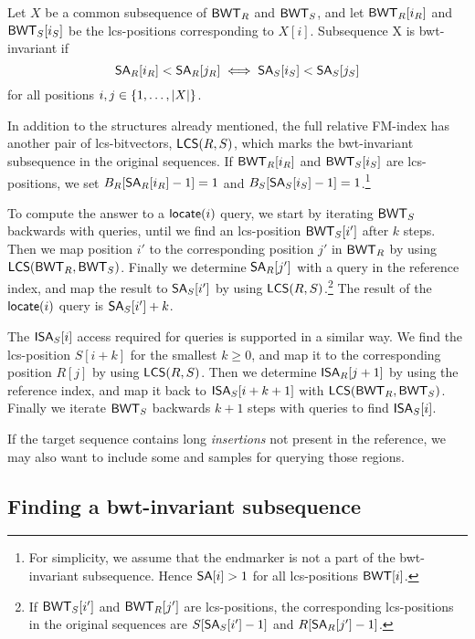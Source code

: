 \begin{definition}\label{def:bwt-invariant}
Let $X$ be a common subsequence of $\mathsf{BWT}_{R}$ and $\mathsf{BWT}_{S}$, and let
$\mathsf{BWT}_{R}[i_{R}]$ and $\mathsf{BWT}_{S}[i_{S}]$ be the lcs-positions corresponding to
$X[i]$. Subsequence X is bwt-invariant if
$$
\mathsf{SA}_{R}[i_{R}] < \mathsf{SA}_{R}[j_{R}] \iff \mathsf{SA}_{S}[i_{S}] < \mathsf{SA}_{S}[j_{S}]
$$
for all positions $i, j \in \{ 1, \dotsc, \lvert X \rvert \}$.
\end{definition}

In addition to the structures already mentioned, the full relative FM-index
has another pair of lcs-bitvectors, $\mathsf{LCS}(R,S)$, which marks the
bwt-invariant subsequence in the original sequences. If $\mathsf{BWT}_{R}[i_{R}]$ and
$\mathsf{BWT}_{S}[i_{S}]$ are lcs-positions, we set $B_{R}[\mathsf{SA}_{R}[i_{R}]-1] = 1$ and
$B_{S}[\mathsf{SA}_{S}[i_{S}]-1] = 1$.\footnote{For simplicity, we assume that the
endmarker is not a part of the bwt-invariant subsequence. Hence $\mathsf{SA}[i] > 1$
for all lcs-positions $\mathsf{BWT}[i]$.}

To compute the answer to a $\mathsf{locate}(i)$ query, we start by iterating
$\mathsf{BWT}_{S}$ backwards with \LF{} queries, until we find an lcs-position
$\mathsf{BWT}_{S}[i']$ after $k$ steps. Then we map position $i'$ to the corresponding
position $j'$ in $\mathsf{BWT}_{R}$ by using $\mathsf{LCS}(\mathsf{BWT}_{R},\mathsf{BWT}_{S})$. Finally we
determine $\mathsf{SA}_{R}[j']$ with a \locate{} query in the reference index, and map
the result to $\mathsf{SA}_{S}[i']$ by using $\mathsf{LCS}(R,S)$.\footnote{If $\mathsf{BWT}_{S}[i']$
and $\mathsf{BWT}_{R}[j']$ are lcs-positions, the corresponding lcs-positions in the
original sequences are $S[\mathsf{SA}_{S}[i']-1]$ and $R[\mathsf{SA}_{R}[j']-1]$.} The result
of the $\mathsf{locate}(i)$ query is $\mathsf{SA}_{S}[i']+k$.

The $\mathsf{ISA}_{S}[i]$ access required for \extract{} queries is supported in a
similar way. We find the lcs-position $S[i+k]$ for the smallest $k \ge 0$, and
map it to the corresponding position $R[j]$ by using $\mathsf{LCS}(R,S)$. Then we
determine $\mathsf{ISA}_{R}[j+1]$ by using the reference index, and map it back to
$\mathsf{ISA}_{S}[i+k+1]$ with $\mathsf{LCS}(\mathsf{BWT}_{R},\mathsf{BWT}_{S})$. Finally we iterate
$\mathsf{BWT}_{S}$ backwards $k+1$ steps with \LF{} queries to find $\mathsf{ISA}_{S}[i]$.

If the target sequence contains long
\emph{insertions} not present in the reference, we may also want to include
some \SA{} and \ISA{} samples for querying those regions.

\subsection{Finding a bwt-invariant subsequence}

